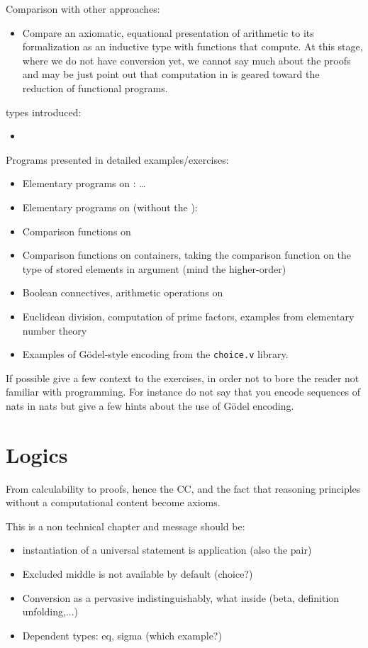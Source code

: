 \documentclass{book}
\begin{document}
Comparison with other approaches:
\begin{itemize}
\item Compare an axiomatic, equational presentation of arithmetic to
  its formalization as an inductive type with functions that
  compute. At this stage, where we do not have conversion yet, we
  cannot say much about the proofs and may be just point out that
  computation in \Coq{} is geared toward the reduction of functional
  programs.
\end{itemize}

\Coq{} types introduced:
\begin{itemize}
\item {}
\end{itemize}

Programs presented in detailed examples/exercises:
\begin{itemize}
\item Elementary programs on : \dots
\item Elementary programs on  (without the ):
\item Comparison functions on 
\item Comparison functions on containers, taking the comparison
  function on the type of stored elements in argument (mind the
  higher-order)
\item Boolean connectives, arithmetic operations on 
\item Euclidean division, computation of prime factors, examples from
  elementary number theory
\item Examples of Gödel-style encoding from the {\tt choice.v} library.
\end{itemize}
If possible give a few context to the exercises, in order not to bore
the reader not familiar with programming. For instance do not say that
you encode sequences of nats in nats but give a few hints about the
use of Gödel encoding.

\chapter{Logics}

From calculability to proofs, hence the CC, and the fact that
reasoning principles without a computational content become axioms.

This is a non technical chapter and message should be:
\begin{itemize}
\item instantiation of a universal statement is application (also the pair)
\item Excluded middle is not available by default (choice?)
\item Conversion as a pervasive indistinguishably, what inside
  (beta, definition unfolding,...)
\item Dependent types: eq, sigma (which example?)
\end{itemize}
\end{document}
